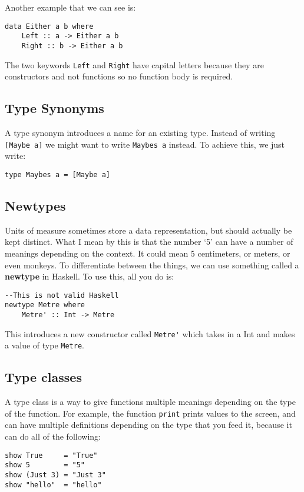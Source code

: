 \documentclass[11pt,a4paper,titlepage]{scrartcl}
\begin{document}
Another example that we can see is:
\begin{lstlisting}
data Either a b where
    Left :: a -> Either a b
    Right :: b -> Either a b
\end{lstlisting}
The two keywords \lstinline|Left| and \lstinline|Right| have capital
letters because they are constructors and not functions so no function
body is required.
\subsection{Type Synonyms}%
\label{sub:synonyms}
A type synonym introduces a name for an existing type. Instead of writing
\lstinline|[Maybe a]| we might want to write \lstinline|Maybes a| instead.
To achieve this, we just write:

\begin{lstlisting}
type Maybes a = [Maybe a]
\end{lstlisting}

\subsection{Newtypes}%
\label{sub:Newtypes}
Units of measure sometimes store a data representation, but should
actually be kept distinct. What I mean by this is that the number `5' can
have a number of meanings depending on the context. It could mean 5
centimeters, or meters, or even monkeys. To differentiate between the
things, we can use something called a \textbf{newtype} in Haskell. To use
this, all you do is:
\begin{lstlisting}
--This is not valid Haskell
newtype Metre where
    Metre' :: Int -> Metre

\end{lstlisting}

This introduces a new constructor called \lstinline|Metre'| which takes in a Int
and makes a value of type \lstinline|Metre|.

\subsection{Type classes}%
\label{sub:types}
A type class is a way to give functions multiple meanings depending on the
type of the function. For example, the function \lstinline|print| prints
values to the screen, and can have multiple definitions depending on the
type that you feed it, because it can do all of the following:
\begin{lstlisting}
show True     = "True"
show 5        = "5"
show (Just 3) = "Just 3"
show "hello"  = "hello"
\end{lstlisting}
\end{document}
